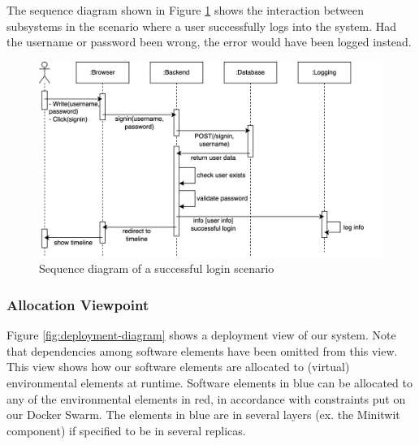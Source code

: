 The sequence diagram shown in Figure \ref{fig:sequence-login} shows the interaction between subsystems in the scenario where a user successfully logs into the system. Had the username or password been wrong, the error would have been logged instead. \\

\begin{figure}[]
    \centering
    \includegraphics[width=\linewidth]{images/sequence-diagram.png}
    \caption{Sequence diagram of a successful login scenario}
    \label{fig:sequence-login}
\end{figure}

\subsubsection{Allocation Viewpoint}

Figure \ref{fig:deployment-diagram} shows a deployment view of our system. Note that dependencies among software elements have been omitted from this view. This view shows how our software elements are allocated to (virtual) environmental elements at runtime. Software elements in blue can be allocated to any of the environmental elements in red, in accordance with constraints put on our Docker Swarm. The elements in blue are in several layers (ex. the Minitwit component) if specified to be in several replicas.  


